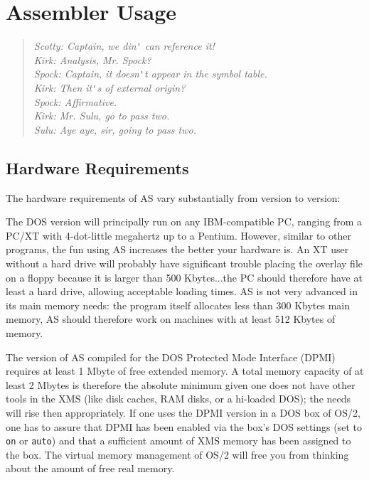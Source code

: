 \documentclass[12pt,twoside]{report}
\newcommand{\tty}[1]{{\tt #1}}
\begin{document}

\cleardoublepage
\chapter{Assembler Usage}

\begin{quote}\begin{raggedright}{\it
Scotty: Captain, we din\verb!'! can reference it! \\
Kirk:   Analysis, Mr. Spock? \\
Spock:  Captain, it doesn\verb!'!t appear in the symbol table. \\
Kirk:   Then it\verb!'!s of external origin? \\
Spock:  Affirmative. \\
Kirk:   Mr. Sulu, go to pass two. \\
Sulu:   Aye aye, sir, going to pass two. \\
}\end{raggedright}\end{quote}


\section{Hardware Requirements}

The hardware requirements of AS vary substantially from version to
version:

The DOS version  will principally run on any
IBM-compatible PC, ranging from a PC/XT with 4-dot-little megahertz up to
a Pentium.  However, similar to other programs, the fun using AS increases
the better your hardware is.  An XT user without a hard drive will
probably have significant trouble placing the overlay file on a floppy
because it is larger than 500 Kbytes...the PC should therefore have at
least a hard drive, allowing acceptable loading times.  AS is not very
advanced in its main memory needs: the program itself allocates less than
300 Kbytes main memory, AS should therefore work on machines with at least
512 Kbytes of memory.

The version of AS  compiled for the DOS Protected
Mode Interface (DPMI) requires at least 1 Mbyte of free extended memory.
A total memory capacity of at least 2 Mbytes is therefore the absolute
minimum given one does not have other tools in the XMS (like disk caches,
RAM disks, or a hi-loaded DOS); the needs will rise then appropriately.
If one uses the DPMI version in a DOS box of OS/2, one has to assure that
DPMI has been enabled via the box's DOS settings (set to \tty{on} or
\tty{auto}) and that a sufficient amount of XMS memory has been assigned
to the box.  The virtual memory management of OS/2 will free you
from thinking about the amount of free real memory.
\end{document}
